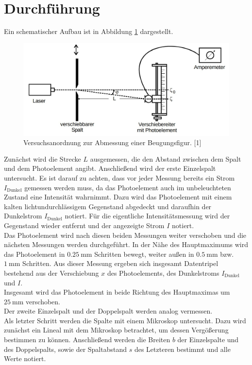 \section{Durchführung}
\label{sec:Durchführung}

Ein schematischer Aufbau ist in Abbildung \ref{fig:Aufbau} dargestellt. 

\begin{figure}
  \centering
  \includegraphics[scale=0.3]{content/Aufbau.jpg}
  \caption{Versuchsanordnung zur Abmessung einer Beugungsfigur. [1]}
  \label{fig:Aufbau}
\end{figure}

Zunächst wird die Strecke $L$ ausgemessen, die den Abstand zwischen dem Spalt und dem Photoelement angibt. 
Anschließend wird der erste Einzelspalt untersucht. Es ist darauf zu achten, dass vor jeder Messung 
bereits ein Strom $I_\text{Dunkel}$ gemessen werden muss, da das Photoelement auch im unbeleuchteten 
Zustand eine Intensität wahrnimmt. Dazu wird das Photoelement mit einem kalten lichtundurchlässigem Gegenstand 
abgedeckt und daraufhin der Dunkelstrom $I_\text{Dunkel}$ notiert. 
Für die eigentliche Intensitätsmessung wird der Gegenstand wieder entfernt und der angezeigte Strom $I$ notiert. \\
Das Photoelement wird nach diesen beiden Messungen weiter verschoben und die nächsten Messungen werden 
durchgeführt. In der Nähe des Hauptmaximums wird das Photoelement in $\SI{0.25}{\milli\meter}$ Schritten bewegt, weiter 
außen in $\SI{0.5}{\milli\meter}$ bzw. $\SI{1}{\milli\meter}$ Schritten. Aus dieser Messung ergeben sich insgesamt 
Datentripel bestehend aus der Verschiebung $x$ des Photoelements, des Dunkelstroms $I_\text{Dunkel}$ und $I$. \\
Insgesamt wird das Photoelement in beide Richtung des Hauptmaximas um $\SI{25}{\milli\meter}$ verschoben. \\
Der zweite Einzelspalt und der Doppelspalt werden analog vermessen. \\
Als letzter Schritt werden die Spalte mit einem Mikroskop untersucht. Dazu wird zunächst ein Lineal mit dem Mikroskop betrachtet, 
um dessen Vergößerung bestimmen zu können. Anschließend werden die Breiten $b$ der Einzelspalte und des Doppelspalts, 
sowie der Spaltabstand $s$ des Letzteren bestimmt und alle Werte notiert.  

